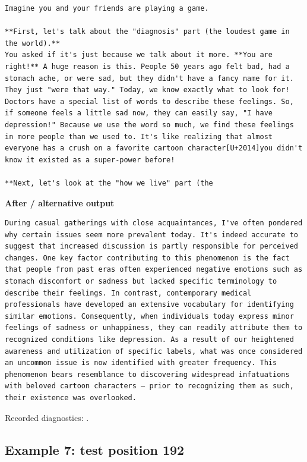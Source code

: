 \begin{Verbatim}
Imagine you and your friends are playing a game.

**First, let's talk about the "diagnosis" part (the loudest game in the world).**
You asked if it's just because we talk about it more. **You are right!** A huge reason is this. People 50 years ago felt bad, had a stomach ache, or were sad, but they didn't have a fancy name for it. They just "were that way." Today, we know exactly what to look for! Doctors have a special list of words to describe these feelings. So, if someone feels a little sad now, they can easily say, "I have depression!" Because we use the word so much, we find these feelings in more people than we used to. It's like realizing that almost everyone has a crush on a favorite cartoon character[U+2014]you didn't know it existed as a super-power before!

**Next, let's look at the "how we live" part (the
\end{Verbatim}

\textbf{After / alternative output}

\begin{Verbatim}
During casual gatherings with close acquaintances, I've often pondered why certain issues seem more prevalent today. It's indeed accurate to suggest that increased discussion is partly responsible for perceived changes. One key factor contributing to this phenomenon is the fact that people from past eras often experienced negative emotions such as stomach discomfort or sadness but lacked specific terminology to describe their feelings. In contrast, contemporary medical professionals have developed an extensive vocabulary for identifying similar emotions. Consequently, when individuals today express minor feelings of sadness or unhappiness, they can readily attribute them to recognized conditions like depression. As a result of our heightened awareness and utilization of specific labels, what was once considered an uncommon issue is now identified with greater frequency. This phenomenon bears resemblance to discovering widespread infatuations with beloved cartoon characters – prior to recognizing them as such, their existence was overlooked.
\end{Verbatim}

Recorded diagnostics:
\texttt{}.

\subsection{Example 7: test position
192}\label{record-docs-watermarking-qualitative-text-textseal2-bira-md-example-7-test-position-192}

